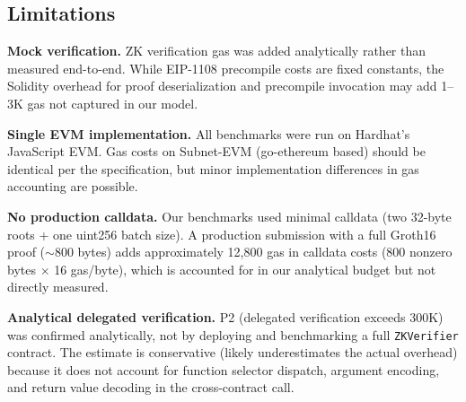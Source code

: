 \subsection{Limitations}

\textbf{Mock verification.} ZK verification gas was added analytically rather than measured
end-to-end. While EIP-1108 precompile costs are fixed constants, the Solidity overhead for
proof deserialization and precompile invocation may add 1--3K gas not captured in our model.

\textbf{Single EVM implementation.} All benchmarks were run on Hardhat's JavaScript EVM.
Gas costs on Subnet-EVM (go-ethereum based) should be identical per the specification, but
minor implementation differences in gas accounting are possible.

\textbf{No production calldata.} Our benchmarks used minimal calldata (two 32-byte roots +
one uint256 batch size). A production submission with a full Groth16 proof ($\sim$800 bytes)
adds approximately 12,800 gas in calldata costs (800 nonzero bytes $\times$ 16 gas/byte),
which is accounted for in our analytical budget but not directly measured.

\textbf{Analytical delegated verification.} P2 (delegated verification exceeds 300K) was
confirmed analytically, not by deploying and benchmarking a full \texttt{ZKVerifier}
contract. The estimate is conservative (likely underestimates the actual overhead) because
it does not account for function selector dispatch, argument encoding, and return value
decoding in the cross-contract call.
